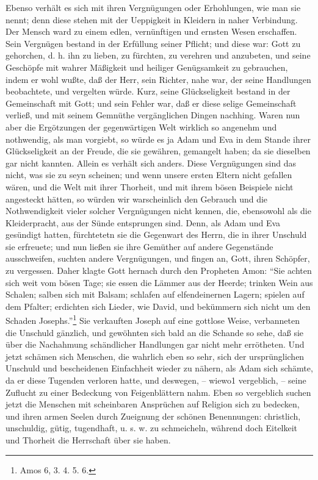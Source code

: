 Ebenso verhält es sich mit ihren Vergnügungen oder Erhohlungen, wie man sie
nennt; denn diese stehen mit der Ueppigkeit in Kleidern in naher Verbindung. Der
Mensch ward zu einem edlen, vernünftigen und ernsten Wesen erschaffen. Sein
Vergnügen bestand in der Erfüllung seiner Pflicht; und diese war: Gott zu
gehorchen, d. h. ihn zu lieben, zu fürchten, zu verehren und anzubeten, und
seine Geschöpfe mit wahrer Mäßigkeit und heiliger Genügsamkeit zu gebrauchen,
indem er wohl wußte, daß der Herr, sein Richter, nahe war, der seine Handlungen
beobachtete, und vergelten würde. Kurz, seine Glückseligkeit bestand in der
Gemeinschaft mit Gott; und sein Fehler war, daß er diese selige Gemeinschaft
verließ, und mit seinem Gemnüthe vergänglichen Dingen nachhing. Waren nun aber
die Ergötzungen der gegenwärtigen Welt wirklich so angenehm und nothwendig, als
man vorgiebt, so würde es ja Adam und Eva in dem Stande ihrer Glückseligkeit an
der Freude, die sie gewähren, gemangelt haben; da sie dieselben gar nicht
kannten. Allein es verhält sich anders. Diese Vergnügungen sind das nicht, was
sie zu seyn scheinen; und wenn unsere ersten Eltern nicht gefallen wären, und
die Welt mit ihrer Thorheit, und mit ihrem bösen Beispiele nicht angesteckt
hätten, so würden wir warscheinlich den Gebrauch und die Nothwendigkeit vieler
solcher Vergnügungen nicht kennen, die, ebensowohl als die Kleiderpracht, aus
der Sünde entsprungen sind. Denn, als Adam und Eva gesündigt hatten, fürchtetetn
sie die Gegenwart des Herrn, die in ihrer Unschuld sie erfreuete; und nun ließen
sie ihre Gemüther auf andere Gegenstände ausschweifen, suchten andere
Vergnügungen, und fingen an, Gott, ihren Schöpfer, zu vergessen. Daher klagte
Gott hernach durch den Propheten Amon: "`Sie achten sich weit vom bösen Tage;
sie essen die Lämmer aus der Heerde; trinken Wein aus Schalen; salben sich mit
Balsam; schlafen auf elfendeinernen Lagern; spielen auf dem Pfalter; erdichten
sich Lieder, wie David, und bekümmern sich nicht um den Schaden
Josephs."'\footnote{Amos 6, 3. 4. 5. 6.} Sie verkauften Joseph auf eine gottlose
Weise, verbanneten die Unschuld gänzlich, und gewöhnten sich bald an die Schande
so sehe, daß sie über die Nachahmung schändlicher Handlungen gar nicht mehr
errötheten. Und jetzt schämen sich Menschen, die wahrlich eben so sehr, sich der
ursprünglichen Unschuld und bescheidenen Einfachheit wieder zu nähern, als Adam
sich schämte, da er diese Tugenden verloren hatte, und deswegen, -- wiewo1
vergeblich, -- seine Zuflucht zu einer Bedeckung von Feigenblättern nahm. Eben
so vergeblich suchen jetzt die Menschen mit scheinbaren Ansprüchen auf Religion
sich zu bedecken, und ihren armen Seelen durch Zueignung der schönen
Benennungen: christlich, unschuldig, gütig, tugendhaft, u. s. w. zu schmeicheln,
während doch Eitelkeit und Thorheit die Herrschaft über sie haben.

